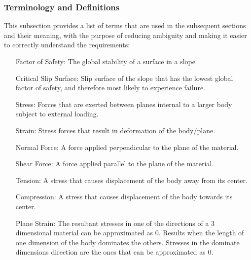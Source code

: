 \documentclass[12pt]{article}
\begin{document}
\subsubsection{Terminology and Definitions}
\label{Sec:TermandDefi}
This subsection provides a list of terms that are used in the subsequent sections and their meaning, with the purpose of reducing ambiguity and making it easier to correctly understand the requirements:
\begin{itemize}
\item[Factor of Safety:]The global stability of a surface in a slope
\item[Critical Slip Surface:]Slip surface of the slope that has the lowest global factor of safety, and therefore most likely to experience failure.
\item[Stress:]Forces that are exerted between planes internal to a larger body subject to external loading.
\item[Strain:]Stress forces that result in deformation of the body/plane.
\item[Normal Force:]A force applied perpendicular to the plane of the material.
\item[Shear Force:]A force applied parallel to the plane of the material.
\item[Tension:]A stress that causes displacement of the body away from its center.
\item[Compression:]A stress that causes displacement of the body towards its center.
\item[Plane Strain:]The resultant stresses in one of the directions of a 3 dimensional material can be approximated as 0. Results when the length of one dimension of the body dominates the others. Stresses in the dominate dimensions direction are the ones that can be approximated as 0.
\end{itemize}
\end{document}
